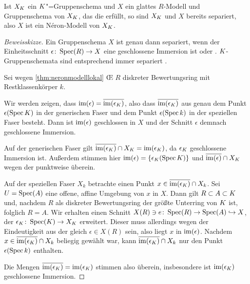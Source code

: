 \documentclass[german]{scrreprt}
\begin{document}
\begin{Bemerkung}\label{nerongruppenschemaglatt}
  Ist $X_{K}$ ein $K$"=Gruppenschema und $X$ ein
  glattes $R$-Modell und Gruppenschema von $X_{K}$, das die
  \NAbbEig erfüllt, so sind $X_{K}$ und $X$ bereits separiert,
  also $X$ ist ein Néron-Modell von $X_{K}$.
  \cite[1.2, Remark 7]{neron} 
  \begin{proof}[Beweisskizze]
    Ein Gruppenschema $X$ ist genau dann separiert, wenn der
    Einheitsschnitt $\epsilon\colon\operatorname{Spec}(R)\to X$ eine geschlossene
    Immersion ist
    \cite[Lemma 38.6.1]{stacksproject} oder \cite[7.1, Lemma 2]{neron}.
    $K$-Gruppenschemata sind entsprechend immer separiert
    \cite[Lemma 38.7.3]{stacksproject}. 

    Sei wegen \autoref{thm:neronmodelllokal} \OE{} $R$ diskreter
    Bewertungsring mit Restklassenkörper $k$.
      
    Wir werden zeigen, dass
    $\operatorname{im}(\epsilon)=\overline{\operatorname{im}(\epsilon_{K})}$,
    also dass $\overline{\operatorname{im}(\epsilon_{K})}$ aus genau dem Punkt
    $\epsilon(\operatorname{Spec}K)$ in der generischen Faser und dem Punkt
    $\epsilon(\operatorname{Spec} k)$ in der speziellen Faser besteht.
    Dann ist $\operatorname{im}(\epsilon)$ geschlossen in $X$ und der Schnitt
    $\epsilon$ demnach geschlossene Immersion.
    
    Auf der generischen Faser gilt
    $\overline{\operatorname{im}(\epsilon_{K})}\cap X_{K}=\operatorname{im}(\epsilon_{K})$,
    da $\epsilon_{K}$ geschlossene Immersion ist.
    Außerdem stimmen hier $\operatorname{im}(\epsilon)=\{\epsilon_{K}(\operatorname{Spec}K)\}$ und
    $\overline{\operatorname{im}(\epsilon)}\cap X_{K}$ wegen der \NAbbEig punktweise
    überein.

    Auf der speziellen Faser $X_k$ betrachte einen Punkt
    $x\in\overline{\operatorname{im}(\epsilon_{K})}\cap X_k$. Sei $U=\operatorname{Spec}(A)$ eine
    offene, affine Umgebung von $x$ in $X$.
    Dann gilt $R\subset A\subset K$
    und, nachdem $R$ als diskreter Bewertungsring der größte Unterring
    von $K$ ist, folglich $R=A$.
    Wir erhalten einen Schnitt
    $X(R)\ni e\colon\operatorname{Spec}(R)\to\operatorname{Spec}(A)\hookrightarrow X$,
    der $\epsilon_{K}\colon\operatorname{Spec}(K)\to X_{K}$ erweitert.
    Dieser muss allerdings wegen der Eindeutigkeit aus der \NAbbEig
    gleich $\epsilon\in X(R)$ sein, also liegt $x$ in $\operatorname{im}(\epsilon)$.
    Nachdem $x\in \overline{\operatorname{im}(\epsilon_{K})}\cap X_k$ beliegig
    gewählt war, kann $\overline{\operatorname{im}(\epsilon_{K})}\cap X_k$ nur den
    Punkt $\epsilon(\operatorname{Spec} k)$ enthalten.

    Die Mengen $\overline{\operatorname{im}(\epsilon_{K})}=\operatorname{im}(\epsilon_{K})$ stimmen
    also überein, insbesondere ist $\operatorname{im}(\epsilon_{K})$ geschlossene
    Immersion.
  \end{proof}
\end{Bemerkung}
\end{document}
